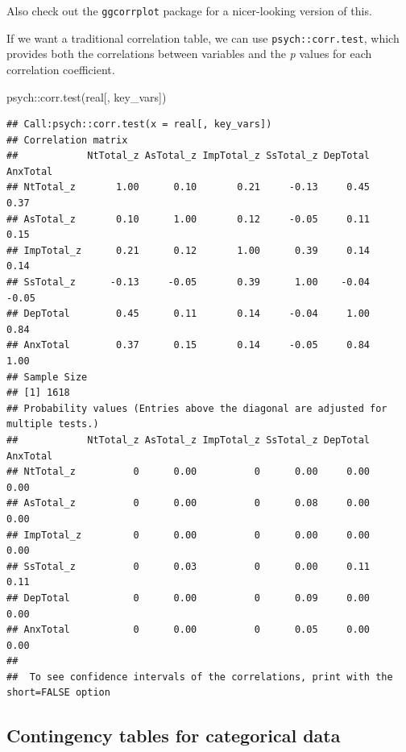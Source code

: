 \documentclass[
]{book}
\newenvironment{Shaded}{\begin{snugshade}}{\end{snugshade}}
\newcommand{\FunctionTok}[1]{\textcolor[rgb]{0.00,0.00,0.00}{#1}}
\newcommand{\NormalTok}[1]{#1}
\newcommand{\SpecialCharTok}[1]{\textcolor[rgb]{0.00,0.00,0.00}{#1}}
\begin{document}
\begin{note}
Also check out the \texttt{ggcorrplot} package for a nicer-looking
version of this.
\end{note}

If we want a traditional correlation table, we can use
\texttt{psych::corr.test}, which provides both the correlations
between variables and the \emph{p} values for each correlation
coefficient.

\begin{Shaded}
\begin{Highlighting}[]
\NormalTok{psych}\SpecialCharTok{::}\FunctionTok{corr.test}\NormalTok{(real[, key\_vars])}
\end{Highlighting}
\end{Shaded}

\begin{verbatim}
## Call:psych::corr.test(x = real[, key_vars])
## Correlation matrix 
##            NtTotal_z AsTotal_z ImpTotal_z SsTotal_z DepTotal AnxTotal
## NtTotal_z       1.00      0.10       0.21     -0.13     0.45     0.37
## AsTotal_z       0.10      1.00       0.12     -0.05     0.11     0.15
## ImpTotal_z      0.21      0.12       1.00      0.39     0.14     0.14
## SsTotal_z      -0.13     -0.05       0.39      1.00    -0.04    -0.05
## DepTotal        0.45      0.11       0.14     -0.04     1.00     0.84
## AnxTotal        0.37      0.15       0.14     -0.05     0.84     1.00
## Sample Size 
## [1] 1618
## Probability values (Entries above the diagonal are adjusted for multiple tests.) 
##            NtTotal_z AsTotal_z ImpTotal_z SsTotal_z DepTotal AnxTotal
## NtTotal_z          0      0.00          0      0.00     0.00     0.00
## AsTotal_z          0      0.00          0      0.08     0.00     0.00
## ImpTotal_z         0      0.00          0      0.00     0.00     0.00
## SsTotal_z          0      0.03          0      0.00     0.11     0.11
## DepTotal           0      0.00          0      0.09     0.00     0.00
## AnxTotal           0      0.00          0      0.05     0.00     0.00
## 
##  To see confidence intervals of the correlations, print with the short=FALSE option
\end{verbatim}

\hypertarget{contingency-tables-for-categorical-data}{%
\subsection{Contingency tables for categorical data}\label{contingency-tables-for-categorical-data}}
\end{document}
